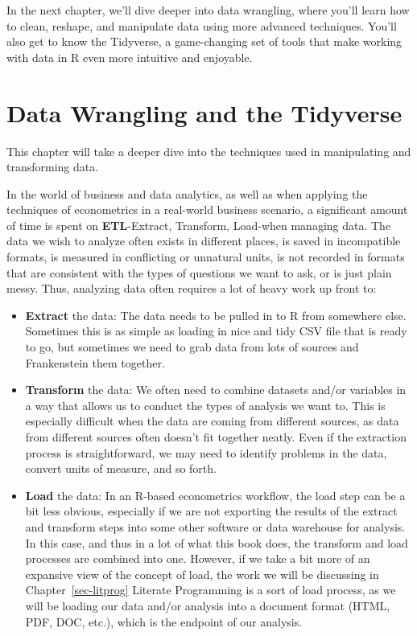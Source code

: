 \documentclass[
  letterpaper,
]{book}
\providecommand{\tightlist}{%
  \setlength{\itemsep}{0pt}\setlength{\parskip}{0pt}}\usepackage{longtable,booktabs,array}
\begin{document}
In the next chapter, we'll dive deeper into data wrangling, where you'll
learn how to clean, reshape, and manipulate data using more advanced
techniques. You'll also get to know the Tidyverse, a game-changing set
of tools that make working with data in R even more intuitive and
enjoyable.


\chapter{Data Wrangling and the Tidyverse}\label{sec-wrangling}

This chapter will take a deeper dive into the techniques used in
manipulating and transforming data.

In the world of business and data analytics, as well as when applying
the techniques of econometrics in a real-world business scenario, a
significant amount of time is spent on \textbf{ETL}-Extract, Transform,
Load-when managing data. The data we wish to analyze often exists in
different places, is saved in incompatible formats, is measured in
conflicting or unnatural units, is not recorded in formats that are
consistent with the types of questions we want to ask, or is just plain
messy. Thus, analyzing data often requires a lot of heavy work up front
to:

\begin{itemize}
\tightlist
\item
  \textbf{Extract} the data: The data needs to be pulled in to R from
  somewhere else. Sometimes this is as simple as loading in nice and
  tidy CSV file that is ready to go, but sometimes we need to grab data
  from lots of sources and Frankenstein them together.
\item
  \textbf{Transform} the data: We often need to combine datasets and/or
  variables in a way that allows us to conduct the types of analysis we
  want to. This is especially difficult when the data are coming from
  different sources, as data from different sources often doesn't fit
  together neatly. Even if the extraction process is straightforward, we
  may need to identify problems in the data, convert units of measure,
  and so forth.
\item
  \textbf{Load} the data: In an R-based econometrics workflow, the load
  step can be a bit less obvious, especially if we are not exporting the
  results of the extract and transform steps into some other software or
  data warehouse for analysis. In this case, and thus in a lot of what
  this book does, the transform and load processes are combined into
  one. However, if we take a bit more of an expansive view of the
  concept of load, the work we will be discussing in
  Chapter~\ref{sec-litprog} Literate Programming is a sort of load
  process, as we will be loading our data and/or analysis into a
  document format (HTML, PDF, DOC, etc.), which is the endpoint of our
  analysis.
\end{itemize}
\end{document}
